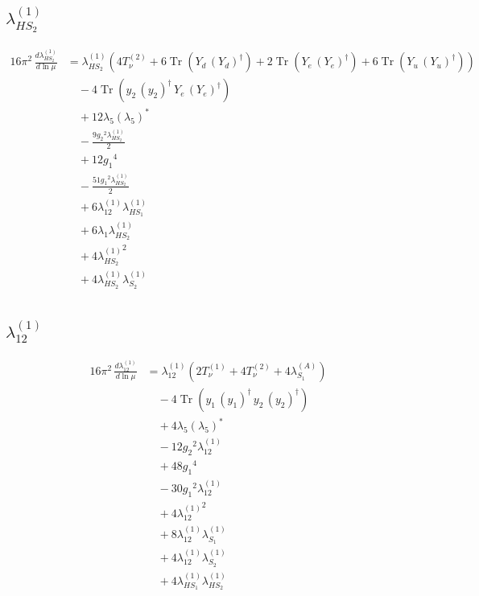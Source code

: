 \documentclass[10pt,a4paper]{article}
\begin{document}
\subsection*{$\lambda_{HS_2}^{(1)}$}
\begin{align*}
16\pi^2\,\frac{d \lambda_{HS_2}^{(1)}}{d\ln\mu} &={\lambda_{HS_2}^{(1)}} (4 T_{\nu}^{(2)}+6 \operatorname{Tr}\!\left({Y_d}\,\left({Y_d}\right)^{\dagger}\right)+2 \operatorname{Tr}\!\left({Y_e}\,\left({Y_e}\right)^{\dagger}\right)+6 \operatorname{Tr}\!\left({Y_u}\,\left({Y_u}\right)^{\dagger}\right)) \\
&\quad -4 \operatorname{Tr}\!\left({y_2}\,\left({y_2}\right)^{\dagger}\,{Y_e}\,\left({Y_e}\right)^{\dagger}\right) \\
&\quad +12 {\lambda_5} \left({\lambda_5}\right)^{*} \\
&\quad -\frac{9 {g_2}^2 {\lambda_{HS_2}^{(1)}}}{2} \\
&\quad +12 {g_1}^4 \\
&\quad -\frac{51 {g_1}^2 {\lambda_{HS_2}^{(1)}}}{2} \\
&\quad +6 {\lambda_{12}^{(1)}} {\lambda_{HS_1}^{(1)}} \\
&\quad +6 {\lambda_1} {\lambda_{HS_2}^{(1)}} \\
&\quad +4 {\lambda_{HS_2}^{(1)}}^2 \\
&\quad +4 {\lambda_{HS_2}^{(1)}} {\lambda_{S_2}^{(1)}} \\
\end{align*}
\subsection*{$\lambda_{12}^{(1)}$}
\begin{align*}
16\pi^2\,\frac{d \lambda_{12}^{(1)}}{d\ln\mu} &={\lambda_{12}^{(1)}} (2 T_{\nu}^{(1)}+4 T_{\nu}^{(2)}+4 {\lambda_{S_1}^{(A)}}) \\
&\quad -4 \operatorname{Tr}\!\left({y_1}\,\left({y_1}\right)^{\dagger}\,{y_2}\,\left({y_2}\right)^{\dagger}\right) \\
&\quad +4 {\lambda_5} \left({\lambda_5}\right)^{*} \\
&\quad -12 {g_2}^2 {\lambda_{12}^{(1)}} \\
&\quad +48 {g_1}^4 \\
&\quad -30 {g_1}^2 {\lambda_{12}^{(1)}} \\
&\quad +4 {\lambda_{12}^{(1)}}^2 \\
&\quad +8 {\lambda_{12}^{(1)}} {\lambda_{S_1}^{(1)}} \\
&\quad +4 {\lambda_{12}^{(1)}} {\lambda_{S_2}^{(1)}} \\
&\quad +4 {\lambda_{HS_1}^{(1)}} {\lambda_{HS_2}^{(1)}} \\
\end{align*}
\end{document}
